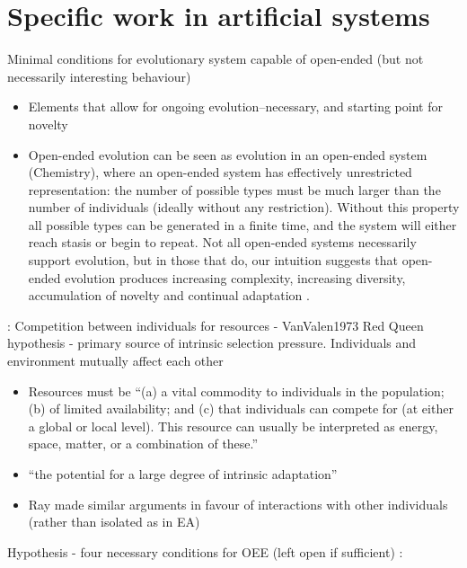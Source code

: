 \section{Specific work in artificial systems}

Minimal conditions for evolutionary system capable of open-ended (but not necessarily interesting behaviour)

\begin{itemize}
	\item
	      Elements that allow for ongoing evolution--necessary, and starting
	      point for novelty
	\item
	      Open-ended evolution can be seen as evolution in an open-ended system
	      (\eg Chemistry), where an open-ended system has effectively
	      unrestricted representation: the number of possible types must be much
	      larger than the number of individuals (ideally without any
	      restriction). Without this property all possible types can be
	      generated in a finite time, and the system will either reach stasis or
	      begin to repeat. Not all open-ended systems necessarily support
	      evolution, but in those that do, our intuition suggests that
	      open-ended evolution produces increasing complexity, increasing
	      diversity, accumulation of novelty and continual adaptation
	      \autocite{Lehman2012}.
\end{itemize}

\autocite{Taylor2001}:
	Competition between individuals for resources - VanValen1973 Red Queen
	hypothesis - primary source of intrinsic selection pressure.
	Individuals and environment mutually affect each other
	\begin{itemize}

		\item	
		Resources must be ``(a) a vital commodity to individuals in the
		population; (b) of limited availability; and (c) that individuals
		can compete for (at either a global or local level). This resource
		can usually be interpreted as energy, space, matter, or a
		combination of these.''
		\item
		``the potential for a large degree of intrinsic adaptation''
		\item	
		Ray made similar arguments in favour of interactions with other individuals (rather than isolated as in EA) 		
	\end{itemize}
	
	
Hypothesis - four necessary conditions for OEE (left open if
sufficient) \autocite{Soros2014}:
			
